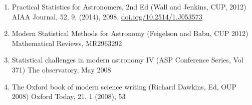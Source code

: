 \vspace{\baselineskip}

\begin{enumerate}

\item
{}
{Practical Statistics for Astronomers, 2nd Ed (Wall and Jenkins, CUP, 2012)}
{AIAA Journal, 52, 9, (2014), 2098, \href{https://doi.org/10.2514/1.J053573}{doi.org/10.2514/1.J053573}}

\item
{}
{Modern Statistical Methods for Astronomy (Feigelson and Babu, CUP 2012)}
{Mathematical Reviews, MR2963292}
\item
{}
{Statistical challenges in modern astronomy IV (ASP Conference Series, Vol 371)}
{The observatory, May 2008}

\item
{}
{The Oxford book of modern science writing (Richard Dawkins, Ed, OUP 2008)}
{Oxford Today, 21, 1 (2008), 53}

\end{enumerate}



